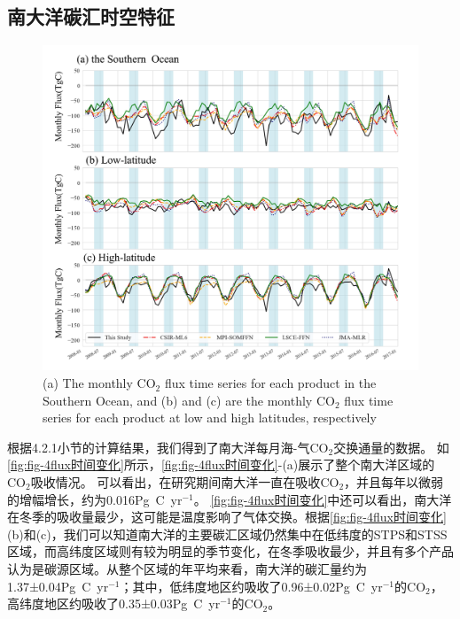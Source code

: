 \subsection{南大洋碳汇时空特征}
\begin{figure}[htb]
    \centering
    \includegraphics[width=\linewidth]{figure/第四章用图/图4-flux时间变化.jpg}
    {(a) The monthly  $\mathrm{CO_2}$ flux time series for each product in the Southern Ocean, and (b) and (c) are the monthly  $\mathrm{CO_2}$ flux time series for each product at low and high latitudes, respectively}
\end{figure}

根据4.2.1小节的计算结果，我们得到了南大洋每月海-气$\mathrm{CO_2}$交换通量的数据。
如\autoref{fig:fig-4flux时间变化}所示，\autoref{fig:fig-4flux时间变化}-(a)展示了整个南大洋区域的$\mathrm{CO_2}$吸收情况。
可以看出，在研究期间南大洋一直在吸收$\mathrm{CO_2}$，并且每年以微弱的增幅增长，约为0.016Pg\ C\ yr$^{-1}$。
\autoref{fig:fig-4flux时间变化}中还可以看出，南大洋在冬季的吸收量最少，这可能是温度影响了气体交换。根据\autoref{fig:fig-4flux时间变化}(b)和(c)，我们可以知道南大洋的主要碳汇区域仍然集中在低纬度的STPS和STSS区域，而高纬度区域则有较为明显的季节变化，在冬季吸收最少，并且有多个产品认为是碳源区域。从整个区域的年平均来看，南大洋的碳汇量约为1.37±0.04Pg\ C\ yr$^{-1}$；其中，低纬度地区约吸收了0.96±0.02Pg\ C\ yr$^{-1}$的$\mathrm{CO_2}$，高纬度地区约吸收了0.35±0.03Pg\ C\ yr$^{-1}$的$\mathrm{CO_2}$。


